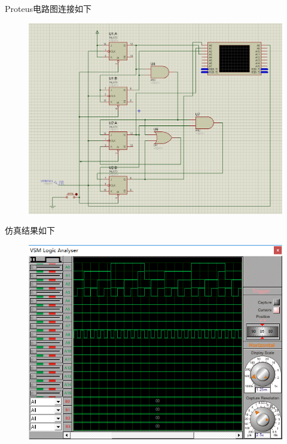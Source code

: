 \par Proteus电路图连接如下
\begin{figure}[H]
    \centering
    \includegraphics[width=0.9\linewidth]{fig/12system_protues.PNG}
\end{figure}
\par 仿真结果如下
\begin{figure}[H]
    \centering
    \includegraphics[width=0.6\linewidth]{fig/12system_wave.PNG}
\end{figure}